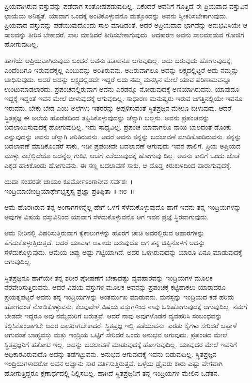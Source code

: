 ಪ್ರಿಯವಾಗಿರುವ ವಸ್ತುವನ್ನು ಪಡೆದಾಗ ಸಂತೋಷಪಡುವುದಿಲ್ಲ. ಏಕೆಂದರೆ ಅವನಿಗೆ ಗೊತ್ತಿದೆ ಈ ಪ್ರಿಯವಾದ ವಸ್ತುವಿನ ಛಾಯೆಯ ಅನಿತ್ಯತೆ. ಯಾವಾಗ ಒಂದಕ್ಕೆ ಅಂಟಿಕೊಳ್ಳುವನೊ ಮತ್ತೊಂದನ್ನು ಅವನು ಸ್ವೀಕರಿಸಬೇಕಾಗುವುದು. ಪ್ರಿಯವಾದ ವಸ್ತುವನ್ನು ಪಡೆಯುವುದೊಂದು ಸಾಲ ಮಾಡಿದಂತೆ. ಅದರ ಅಪ್ರಿಯವಾದ ಭಾಗವನ್ನು ಅನುಭವಿಸಿಯೇ ಆ ಸಾಲವನ್ನು ತೀರಿಸ ಬೇಕಾದರೆ. ಸಾಲ ಮಾಡಿದರೆ ತೀರಿಸಬೇಕಾಗುವುದು. ಆದಕಾರಣ ಅವನು ಸಾಲಮಾಡುವ ಗೋಜಿಗೆ ಹೋಗುವುದಿಲ್ಲ.

ಹಾಗೆಯೆ ಅಪ್ರಿಯವಾಗಿರುವುದು ಬಂದರೆ ಅವನು ಹತಾಶನೂ ಆಗುವುದಿಲ್ಲ. ಅದು ಬರುವುದು ಹೋಗುವುದಕ್ಕೆ, ಎಂದೆಂದಿಗೂ ಇರುವುದಕ್ಕಲ್ಲ ಎಂಬುದನ್ನು ಅರಿತಿರುವನು. ಅದಿರು\-ವಾಗಲೂ ಅದನ್ನು ಲಕ್ಷ್ಯದಲ್ಲಿಟ್ಟರೆ ಅದು ನಮ್ಮನ್ನು ಬಾಧಿಸುವುದು. ಆದರೆ ಅದನ್ನು ಲಕ್ಷ್ಯದಲ್ಲಿಡದೇ ಇದ್ದರೆ ಅದು ನಮ್ಮ ಮನಸ್ಸಿನ ಮೇಲೆ ಯಾವ ಪರಿಣಾಮವನ್ನೂ ಉಂಟುಮಾಡಲಾರದು. ಪ್ರಪಂಚದಲ್ಲಿರುವಾಗ ಅವನು ಎರಡನ್ನೂ ನೋಡುವುದಕ್ಕೆ ಅಣಿಯಾಗಿರುವನು. ಯಾವುದೂ ಇದ್ದಕ್ಕೆ ಇದ್ದಂತೆ ಇವನ ಮೇಲೆ ಬೀಳುವುದಕ್ಕೆ ಆಗುವುದಿಲ್ಲ. ಸಾಧಾರಣ ಮನುಷ್ಯರು ಇರುವ ಜಗತ್ತಿನಲ್ಲಿಯೇ ಇವನೂ ಇರುವನು. ಬೇಕು ಬೇಡ ಎಂಬ ಅಲೆಗಳು ಇತರರನ್ನು ಅಪ್ಪಳಿಸುವಂತೆ ಸ್ಥಿತಪ್ರಜ್ಞನ ಮೇಲೂ ಬೀಳುವುವು. ಆದರೆ ಸ್ಥಿತಪ್ರಜ್ಞ ಈ ಅಲೆಯ ಹೊಡೆತದಿಂದ ತಪ್ಪಿಸಿಕೊಳ್ಳುವುದನ್ನು ಚೆನ್ನಾಗಿ ಬಲ್ಲನು. ಅವನು ಪ್ರಪಂಚವನ್ನು ಬದಲಾಯಿಸುವುದಕ್ಕೆ ಹೋಗುವುದಿಲ್ಲ. ಇದು ಸಾಧ್ಯವಿಲ್ಲ. ಪ್ರಪಂಚ ಯಾವಾಗಲೂ ನಾಯಿ ಬಾಲದಂತೆ ಡೊಂಕು ಎನ್ನುವುದನ್ನು ಅವನು ಚೆನ್ನಾಗಿ ಅರಿತಿರುವನು. ಆದರೆ ಅವನು ತನ್ನನ್ನು ಬದಲಾವಣೆ ಮಾಡಿಕೊಂಡಿರುವನು. ತನ್ನನ್ನು ಬದಲಾವಣೆ ಮಾಡಿಕೊಂಡರೆ ಸಾಕು, ಇಡೀ ಪ್ರಪಂಚವೇ ಬದಲಾವಣೆ ಆಗುವುದು ಇವನ ಪಾಲಿಗೆ. ಪ್ರಿಯ ಅಪ್ರಿಯದ ಮುಳ್ಳು ಎಲ್ಲೆಲ್ಲಿದೆಯೊ ಅದನ್ನೆಲ್ಲ ಗುಡಿಸಿ ಆಚೆಗೆ ಎಸೆಯುವುದಕ್ಕೆ ಹೋಗುವು ದಿಲ್ಲ. ಅವನು ಕಾಲಿಗೆ ಒಂದು ಜೊತೆ ಎಕ್ಕಡ ಹಾಕಿಕೊಂಡು ಹೋಗುವನು. ಈ ಸಣ್ಣ ಬದಲಾವಣೆ ಸಾಕು, ಆ ದೊಡ್ಡ ಕಿರುಕುಳದಿಂದ ಪಾರಾಗುವುದಕ್ಕೆ.

\begin{shloka}
ಯದಾ ಸಂಹರತೇ ಚಾಯಂ ಕೂರ್ಮೋಽಂಗಾನೀವ ಸರ್ವಶಃ~।\\ಇಂದ್ರಿಯಾಣೀಂದ್ರಿಯಾರ್ಥೇಭ್ಯಸ್ತಸ್ಯ ಪ್ರಜ್ಞಾ ಪ್ರತಿಷ್ಠಿತಾ \hfill॥ ೫೮~॥
\end{shloka}

\begin{artha}
ಆಮೆ ಹೊರಗಿರುವ ತನ್ನ ಅಂಗಾಗಗಳನ್ನೆಲ್ಲ ಹೇಗೆ ಒಳಗೆ ಸೆಳೆದುಕೊಳ್ಳುವುದೊ ಹಾಗೆ ಇವನು ತನ್ನ ಇಂದ್ರಿಯಗಳನ್ನು ಅವುಗಳ ವಿಷಯ ವಸ್ತುವಿನಿಂದ ಯಾವಾಗ ಸೆಳೆದುಕೊಳ್ಳುವನೊ ಆಗ ಇವನ ಪ್ರಜ್ಞೆ ಸ್ಥಿರವಾಗುವುದು.
\end{artha}

ಆಮೆ ನೀರಿನಲ್ಲಿ ವಿಹರಿಸುತ್ತಿರುವಾಗ ಕೈಕಾಲುಗಳನ್ನು ಹೊರಗೆ ಚಾಚಿ ಅದರಲ್ಲಿರುವ ಆಹಾರಗಳನ್ನು ತೆಗೆದುಕೊಳ್ಳುತ್ತಿರುತ್ತದೆ. ಆದರೆ ಯಾವಾಗ ಅಪಾಯ ಬರುವುದೊ ಆಗ ತನ್ನ ಚಿಪ್ಪಿನೊಳಗೆ ಅದನ್ನು ಸೆಳೆದುಕೊಳ್ಳುವುದು. ಆಮೆಯ ಚಿಪ್ಪು ಅಷ್ಟು ಗಟ್ಟಿಯಾಗಿದೆ. ಅದರ ಒಳಗಿರುವುದನ್ನು ಯಾರೂ ಏನೂ ಮಾಡುವುದಕ್ಕೆ ಆಗುವುದಿಲ್ಲ.

ಸ್ಥಿತಪ್ರಜ್ಞನೂ ಹಾಗೆಯೇ ತನ್ನ ಶರೀರ ಪೋಷಣೆಗೆ ಬೇಕಾದಷ್ಟು ವ್ಯವಹಾರವನ್ನು ಇಂದ್ರಿಯಗಳ ಮೂಲಕ ನೆರವೇರಿಸುತ್ತಿರುವನು. ಆದರೆ ವಿಷಯ ವಸ್ತುಗಳ ಮೂಲಕ ಅವನನ್ನು ಪ್ರಪಂಚಕ್ಕೆ ಕಟ್ಟಿಹಾಕಲು ಯಾರಾದರೂ ಪ್ರಯತ್ನಪಟ್ಟರೆ ಅವನು ತನ್ನ ಇಂದ್ರಿಯಗಳನ್ನು ಅಂತರ್ಮುಖ ಮಾಡುವನು. ಮನಸ್ಸನ್ನು ಇಂದ್ರಿಯದ ಕಡೆ ಹರಿದು ಹೋಗದಂತೆ ನೋಡಿಕೊಳ್ಳುವನು. ಕೆಲವುವೇಳೆ ವಿಷಯ ವಸ್ತುಗಳಿಂದ ನಾವು ಓಡಿಹೋಗುವುದಕ್ಕೆ ಆಗುವುದಿಲ್ಲ. ನಮಗೆ ಬೇಡದೇ ಇದ್ದರೂ ಅವು ನಮ್ಮೆದುರಿಗೆ ಬರುತ್ತವೆ. ಆದರೆ ನಾವು ಅವುಗಳೊಡನೆ ವ್ಯವಹರಿಸಿ ಸಂಬಂಧವನ್ನು ಕಲ್ಪಿಸಿಕೊಂಡಾಗಲೇ ಅದರ ದಾಸರಾಗಬೇಕಾದರೆ. ಸ್ಥಿತಪ್ರಜ್ಞ ಇಲ್ಲಿ ತಡೆಯುವನು. ಎರಡು ಕೈಗಳು ಸೇರಿದರೆ ಚಪ್ಪಾಳೆ ಆಗುವಂತೆ ಬಾಹ್ಯವಸ್ತು ಮತ್ತು ಇಂದ್ರಿಯ ಒಟ್ಟಿಗೆ ಸೇರಿದರೆ ಒಂದು ಅನುಭವ ಆಗುವುದು. ಪ್ರಪಂಚದ ಮೇಲೆ ಸ್ಥಿತಪ್ರಜ್ಞನಿಗೆ ಹತೋಟಿ ಇಲ್ಲ. ಅದನ್ನು ಬದಲಾವಣೆ ಮಾಡುವುದಕ್ಕೆ ಹೋಗುವುದಿಲ್ಲ. ಯಾವುದರ ಮೇಲೆ ಇವನಿಗೆ ಅಧಿಕಾರವಿರುವುದೊ ಅದನ್ನು ತಡೆಗಟ್ಟುವನು. ಅನುಭವ ಆಗುವುದಕ್ಕೆ ಇವನು ಬಿಡುವುದಿಲ್ಲ. ಸ್ಥಿತಪ್ರಜ್ಞನ ಇಂದ್ರಿಯಗಳಾದರೋ ಅವನ ಆಜ್ಞಾನು ಸಾರ ವರ್ತಿಸುತ್ತಿರುತ್ತವೆ. ಒಳ್ಳೆಯ ಡ್ರೈವರು ಕಾರು ಎಷ್ಟು ವೇಗವಾಗಿ ಹೋಗುತ್ತಿದ್ದರೂ ಕ್ಷಣಾರ್ಧದಲ್ಲಿ ನಿಲ್ಲಿಸಬಲ್ಲ. ಹಾಗಿದೆ ಸ್ಥಿತಪ್ರಜ್ಞನಿಗೆ ತನ್ನ ಇಂದ್ರಿಯಗಳ ಮೇಲಿನ ಒಡೆತನ.

